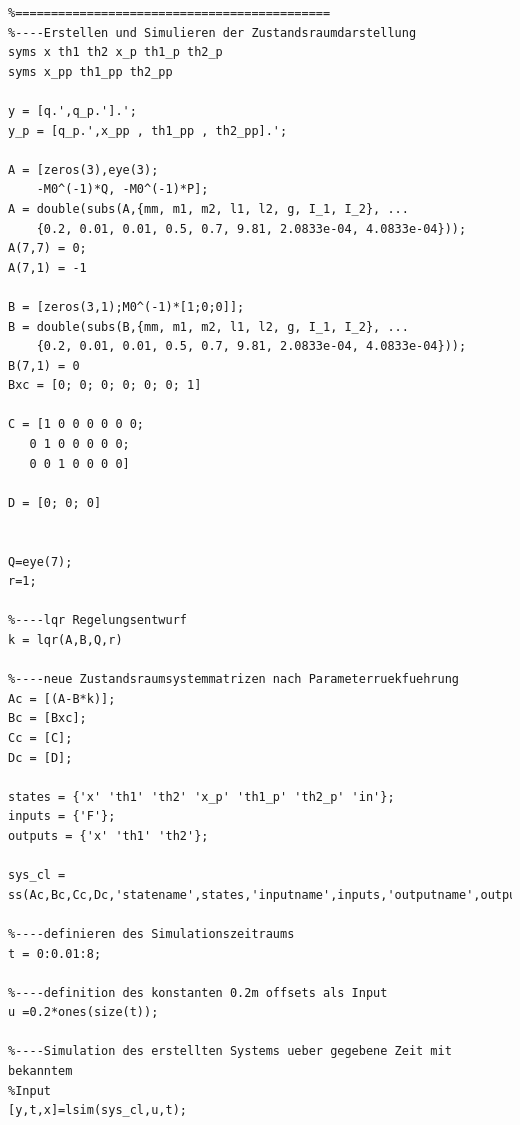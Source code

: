 \documentclass[a4paper, 10pt]{report}
\begin{document}
\begin{lstlisting}
%============================================
%----Erstellen und Simulieren der Zustandsraumdarstellung
syms x th1 th2 x_p th1_p th2_p
syms x_pp th1_pp th2_pp

y = [q.',q_p.'].';
y_p = [q_p.',x_pp , th1_pp , th2_pp].';

A = [zeros(3),eye(3);
    -M0^(-1)*Q, -M0^(-1)*P];
A = double(subs(A,{mm, m1, m2, l1, l2, g, I_1, I_2}, ...
    {0.2, 0.01, 0.01, 0.5, 0.7, 9.81, 2.0833e-04, 4.0833e-04}));
A(7,7) = 0;
A(7,1) = -1

B = [zeros(3,1);M0^(-1)*[1;0;0]];
B = double(subs(B,{mm, m1, m2, l1, l2, g, I_1, I_2}, ...
    {0.2, 0.01, 0.01, 0.5, 0.7, 9.81, 2.0833e-04, 4.0833e-04}));
B(7,1) = 0
Bxc = [0; 0; 0; 0; 0; 0; 1]

C = [1 0 0 0 0 0 0;
   0 1 0 0 0 0 0;
   0 0 1 0 0 0 0]

D = [0; 0; 0]


Q=eye(7);
r=1;

%----lqr Regelungsentwurf
k = lqr(A,B,Q,r)

%----neue Zustandsraumsystemmatrizen nach Parameterruekfuehrung
Ac = [(A-B*k)];
Bc = [Bxc];
Cc = [C];
Dc = [D];

states = {'x' 'th1' 'th2' 'x_p' 'th1_p' 'th2_p' 'in'};
inputs = {'F'};
outputs = {'x' 'th1' 'th2'};

sys_cl = ss(Ac,Bc,Cc,Dc,'statename',states,'inputname',inputs,'outputname',outputs);

%----definieren des Simulationszeitraums
t = 0:0.01:8;

%----definition des konstanten 0.2m offsets als Input
u =0.2*ones(size(t));

%----Simulation des erstellten Systems ueber gegebene Zeit mit bekanntem
%Input
[y,t,x]=lsim(sys_cl,u,t);

\end{lstlisting}
\end{document}
